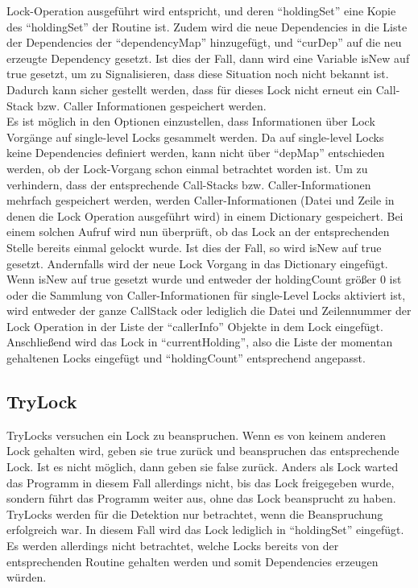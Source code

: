 Lock-Operation ausgeführt wird entspricht, und deren ``holdingSet'' eine 
Kopie des ``holdingSet'' der Routine ist. Zudem wird die neue Dependencies
in die Liste der Dependencies der ``dependencyMap'' hinzugefügt, und ``curDep''
auf die neu erzeugte Dependency gesetzt. Ist dies der Fall, dann wird eine 
Variable isNew auf true gesetzt, um zu Signalisieren, dass diese Situation 
noch nicht bekannt ist.
Dadurch kann sicher gestellt werden, dass für dieses Lock nicht erneut 
ein Call-Stack bzw. Caller Informationen gespeichert werden.\\
Es ist möglich in den Optionen einzustellen, dass Informationen über Lock 
Vorgänge auf single-level Locks gesammelt werden. Da auf single-level Locks keine
Dependencies definiert werden, kann nicht über ``depMap'' entschieden werden, 
ob der Lock-Vorgang schon einmal betrachtet worden ist. Um zu verhindern, dass 
der entsprechende Call-Stacks bzw. Caller-Informationen mehrfach gespeichert 
werden, werden Caller-Informationen (Datei und Zeile in denen die Lock Operation 
ausgeführt wird) in einem Dictionary gespeichert. Bei einem solchen Aufruf wird
nun überprüft, ob das Lock an der entsprechenden Stelle bereits einmal gelockt 
wurde. Ist dies der Fall, so wird isNew auf true gesetzt. Andernfalls wird der 
neue Lock Vorgang in das Dictionary eingefügt.\\
Wenn isNew auf true gesetzt wurde und entweder der holdingCount größer 0 ist 
oder die Sammlung von Caller-Informationen für single-Level Locks aktiviert ist,
wird entweder der ganze CallStack oder lediglich die Datei und Zeilennummer der 
Lock Operation in der Liste der ``callerInfo'' Objekte in dem Lock eingefügt.
Anschließend wird das Lock in ``currentHolding'', also die Liste der momentan
gehaltenen Locks eingefügt und ``holdingCount'' entsprechend angepasst.


\subsection{TryLock}\label{Chap::Implementation:Logging.TryLock}
TryLocks versuchen ein Lock zu beanspruchen. Wenn es von keinem anderen Lock 
gehalten wird, geben sie true zurück und beanspruchen das entsprechende Lock. 
Ist es nicht möglich, dann geben sie false zurück. Anders als Lock warted das 
Programm in diesem Fall allerdings nicht, bis das Lock freigegeben wurde, sondern
führt das Programm weiter aus, ohne das Lock beansprucht zu haben.\\ 
TryLocks werden für die Detektion nur betrachtet, wenn die Beanspruchung 
erfolgreich war. In diesem Fall wird das Lock lediglich in ``holdingSet'' 
eingefügt.
Es werden allerdings nicht betrachtet, welche Locks bereits von der 
entsprechenden Routine gehalten werden und somit Dependencies erzeugen 
würden.

